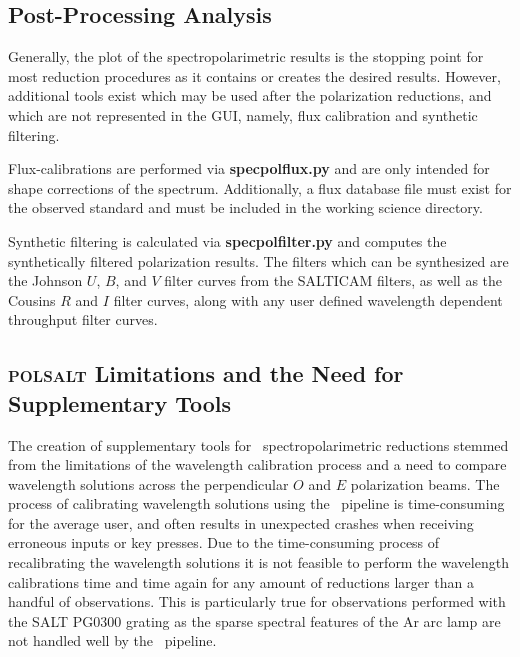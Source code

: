 \subsection{Post-Processing Analysis}

Generally, the plot of the spectropolarimetric results is the stopping point for most reduction procedures as it contains or creates the desired results. However, additional tools exist which may be used after the polarization reductions, and which are not represented in the \gls{GUI}, namely, flux calibration and synthetic filtering.

Flux-calibrations are performed via \textbf{specpolflux.py} and are only intended for shape corrections of the spectrum. Additionally, a flux database file must exist for the observed standard and must be included in the working science directory.

Synthetic filtering is calculated via \textbf{specpolfilter.py} and computes the synthetically filtered polarization results. The filters which can be synthesized are the Johnson $U$, $B$, and $V$ filter curves from the \gls{SALTICAM} filters, as well as the Cousins $R$ and $I$ filter curves, along with any user defined wavelength dependent throughput filter curves.

\subsection{\textsc{polsalt} Limitations and the Need for Supplementary Tools} \label{subsec:polsalt_limits}

The creation of supplementary tools for \polsalt\ spectropolarimetric reductions stemmed from the limitations of the wavelength calibration process and a need to compare wavelength solutions across the perpendicular $O$ and $E$ polarization beams. The process of calibrating wavelength solutions using the \polsalt\ pipeline is time-consuming for the average user, and often results in unexpected crashes when receiving erroneous inputs or key presses. Due to the time-consuming process of recalibrating the wavelength solutions it is not feasible to perform the wavelength calibrations time and time again for any amount of reductions larger than a handful of observations. This is particularly true for observations performed with the \gls{SALT} PG$0300$ grating as the sparse spectral features of the Ar arc lamp are not handled well by the \polsalt\ pipeline.

